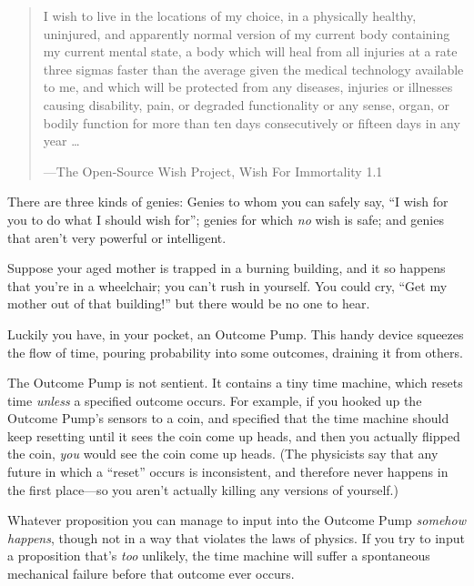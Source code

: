 \myendsectiontext


\begin{quote}
{
 I wish to live in the locations of my choice, in a physically
healthy, uninjured, and apparently normal version of my current body
containing my current mental state, a body which will heal from all
injuries at a rate three sigmas faster than the average given the
medical technology available to me, and which will be protected from
any diseases, injuries or illnesses causing disability, pain, or
degraded functionality or any sense, organ, or bodily function for more
than ten days consecutively or fifteen days in any year \ldots}

{\raggedleft
 {}---The Open-Source Wish Project, Wish For Immortality 1.1
 \par}
\end{quote}



{
 There are three kinds of genies: Genies to whom you can safely
say, ``I wish for you to do what I should wish
for''; genies for which \textit{no} wish is safe; and
genies that aren't very powerful or intelligent.}

{
 Suppose your aged mother is trapped in a burning building, and it
so happens that you're in a wheelchair; you
can't rush in yourself. You could cry,
``Get my mother out of that
building!'' but there would be no one to hear.}

{
 Luckily you have, in your pocket, an Outcome Pump. This handy
device squeezes the flow of time, pouring probability into some
outcomes, draining it from others.}

{
 The Outcome Pump is not sentient. It contains a tiny time machine,
which resets time \textit{unless} a specified outcome occurs. For
example, if you hooked up the Outcome Pump's sensors to
a coin, and specified that the time machine should keep resetting until
it sees the coin come up heads, and then you actually flipped the coin,
\textit{you} would see the coin come up heads. (The physicists say that
any future in which a ``reset''
occurs is inconsistent, and therefore never happens in the first
place---so you aren't actually killing any versions of
yourself.)}

{
 Whatever proposition you can manage to input into the Outcome Pump
\textit{somehow happens}, though not in a way that violates the laws of
physics. If you try to input a proposition that's
\textit{too} unlikely, the time machine will suffer a spontaneous
mechanical failure before that outcome ever occurs.}

